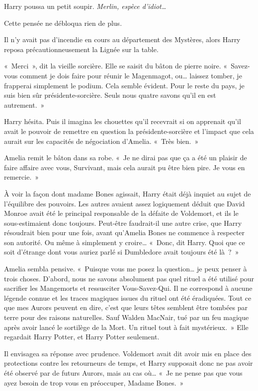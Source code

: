 Harry poussa un petit soupir.
\emph{Merlin, espèce d'idiot…}

Cette pensée ne débloqua rien de plus.

Il n'y avait pas d'incendie en cours au département des Mystères, alors Harry reposa précautionneusement la Lignée sur la table.

«~Merci~», dit la vieille sorcière.
Elle se saisit du bâton de pierre noire.
«~Savez-vous comment je dois faire pour réunir le Magenmagot, ou… laissez tomber, je frapperai simplement le podium.
Cela semble évident.
Pour le reste du pays, je suis bien sûr présidente-sorcière.
Seuls nous quatre savons qu'il en est autrement.~»

Harry hésita.
Puis il imagina les chouettes qu'il recevrait si on apprenait qu'il avait le pouvoir de remettre en question la présidente-sorcière et l'impact que cela aurait sur les capacités de négociation d'Amelia.
«~Très bien.~»

Amelia remit le bâton dans sa robe.
«~Je ne dirai pas que ça a été un plaisir de faire affaire avec vous, Survivant, mais cela aurait pu être bien pire.
Je vous en remercie.~»

À voir la façon dont madame Bones agissait, Harry était déjà inquiet au sujet de l'équilibre des pouvoirs.
Les autres avaient assez logiquement déduit que David Monroe avait été le principal responsable de la défaite de Voldemort, et ils le sous-estimaient donc toujours.
Peut-être faudrait-il une autre crise, que Harry résoudrait bien pour une fois, avant qu'Amelia Bones ne commence à respecter son autorité.
Ou même à simplement y croire…
«~Donc, dit Harry.
Quoi que ce soit d'étrange dont vous auriez parlé si Dumbledore avait toujours été là~?~»

Amelia sembla pensive.
«~Puisque vous me posez la question… je peux penser à trois choses.
D'abord, nous ne savons absolument pas quel rituel a été utilisé pour sacrifier les Mangemorts et ressusciter Vous-Savez-Qui.
Il ne correspond à aucune légende connue et les traces magiques issues du rituel ont été éradiquées.
Tout ce que mes Aurors peuvent en dire, c'est que leurs têtes semblent être tombées par terre pour des raisons naturelles.
Sauf Walden MacNair, tué par un feu magique après avoir lancé le sortilège de la Mort.
Un rituel tout à fait mystérieux.~»
Elle regardait Harry Potter, et Harry Potter seulement.

Il envisagea sa réponse avec prudence.
Voldemort avait dit avoir mis en place des protections contre les retourneurs de temps, et Harry supposait donc ne pas avoir été observé par de futurs Aurors, mais au cas où…
«~Je ne pense pas que vous ayez besoin de trop vous en préoccuper, Madame Bones.~»

